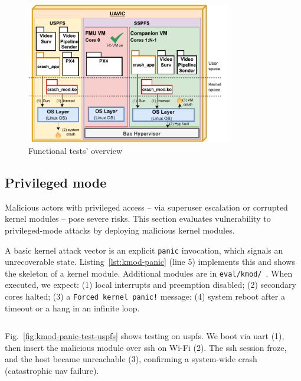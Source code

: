 \begin{figure}[!hbt]
  \centering
  \includegraphics[width=0.8\textwidth]{./img/pdf/uav-main-eval-funcTest}
  \caption{Functional tests' overview}%
  \label{fig:uav-main-eval-kmod}
\end{figure}

\subsection{Privileged mode}
\label{sec:privileged-mode}
Malicious actors with privileged access -- via superuser escalation or corrupted
kernel modules -- pose severe risks. This section evaluates vulnerability to
privileged-mode attacks by deploying malicious kernel modules.

A basic kernel attack vector is an explicit \lstinline{panic} invocation, which
signals an unrecoverable state. Listing~\ref{lst:kmod-panic} (line 5) implements
this and shows the skeleton of a kernel module. Additional modules are in
\lstinline{eval/kmod/}~\cite{thesis-sw-github}. When executed, we expect: (1)
local interrupts and preemption disabled; (2) secondary cores halted; (3) a
\lstinline{Forced kernel panic!} message; (4) system reboot after a timeout or a
hang in an infinite loop.

\begin{longlisting}
\centering
\inputminted[]{c}{./listing/kmod_panic.c}
\caption[Functional tests: implementation of the panic kernel module]{Functional
  tests: implementation of the Panic kernel module (see
  \lstinline{panic_module.c}~\cite{thesis-sw-github})}
\label{lst:kmod-panic}
\end{longlisting}

Fig.~\ref{fig:kmod-panic-test-uspfs} shows testing on \gls{uspfs}. We boot via
\gls{uart} (1), then insert the malicious module over \gls{ssh} on Wi-Fi (2). The \gls{ssh}
session froze, and the host became unreachable (3), confirming a system-wide
crash (catastrophic \gls{uav} failure).

